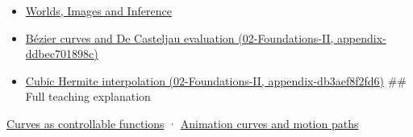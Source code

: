 \begin{itemize}
\item
  \href{Continuous\%20Notes/University\%20-\%20Worlds,\%20Images\%20and\%20Inference\%20-\%20Graphics,\%20Vision\%20and\%20Photography}{Worlds, Images and Inference}
\item
  \href{../02-Foundations-II/main.pdf\#nameddest=appendix-ddbec701898c}{Bézier curves and De Casteljau evaluation (02-Foundations-II, appendix-ddbec701898c)}
\item
  \href{../02-Foundations-II/main.pdf\#nameddest=appendix-db3aef8f2fd6}{Cubic Hermite interpolation (02-Foundations-II, appendix-db3aef8f2fd6)} \#\# Full teaching explanation
\end{itemize}

\href{Continuous\%20Notes/University\%20-\%20Worlds,\%20Images\%20and\%20Inference\%20-\%20Graphics,\%20Vision\%20and\%20Photography\#Curves\%20as\%20controllable\%20functions}{Curves as controllable functions} · \href{Continuous\%20Notes/University\%20-\%20Worlds,\%20Images\%20and\%20Inference\%20-\%20Graphics,\%20Vision\%20and\%20Photography\#Animation\%20curves\%20and\%20motion\%20paths}{Animation curves and motion paths}

